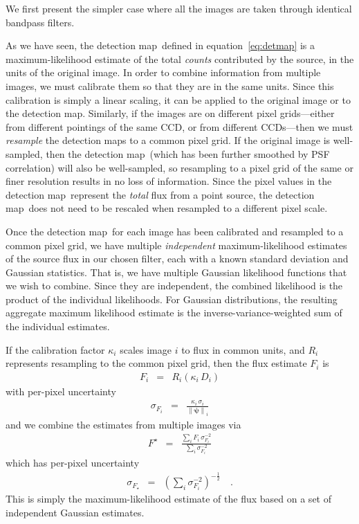 \documentclass[11pt,letterpaper,linenumbers]{aastex63}
\newcommand{\equationname}{equation}
\newcommand{\eqnref}[1]{\mbox{\equationname~\ref{#1}}}
\newcommand{\detmap}{detection map}
\newcommand{\psf}{\psi}
\newcommand{\psfnorm}{\norm{\bm{\psf}}}
\newcommand{\norm}[1]{\left\lVert #1 \right\rVert}
\begin{document}
We first present the simpler case where all the images are taken
through identical bandpass filters.

As we have seen, the \detmap\ defined in \eqnref{eq:detmap} is a
maximum-likelihood estimate of the total \emph{counts} contributed by
the source, in the units of the original image.  In order to
combine information from multiple images, we must calibrate them so
that they are in the same units.  Since this calibration is simply a
linear scaling, it can be applied to the original image or to the
\detmap.  Similarly, if the images are on different pixel
grids---either from different pointings of the same CCD, or from
different CCDs---then we must \emph{resample} the \detmap s to a
common pixel grid.
%
If the original image is well-sampled, then the \detmap\ (which has
been further smoothed by PSF correlation) will also be well-sampled,
so resampling to a pixel grid of the same or finer resolution results
in no loss of information.
%
Since the pixel values in the \detmap\ represent the \emph{total} flux
from a point source, the \detmap\ does not need to be rescaled when
resampled to a different pixel scale.



Once the \detmap\ for each image has been calibrated and resampled to
a common pixel grid, we have multiple \emph{independent}
maximum-likelihood estimates of the source flux in our chosen filter,
each with a known standard deviation and Gaussian statistics.  That
is, we have multiple Gaussian likelihood functions that we wish to
combine.  Since they are independent, the combined likelihood is the
product of the individual likelihoods.  For Gaussian distributions,
the resulting aggregate maximum likelihood estimate is the
inverse-variance-weighted sum of the individual estimates.

If the calibration factor $\kappa_i$ scales image $i$ to flux in
common units, and $R_i$ represents resampling to the common pixel grid,
then the flux estimate $F_i$ is
\begin{eqnarray}
F_i &=& R_i(\kappa_i \, D_i)
\end{eqnarray}
with per-pixel uncertainty
\begin{eqnarray}
\sigma_{F_i} &=& \frac{\kappa_i \, \sigma_{i}}{\psfnorm_i}
\end{eqnarray}
and we combine the estimates from multiple images via
\begin{eqnarray}
F^{\star} &=& \frac{\displaystyle\sum_i F_i \, \sigma^{-2}_{F_i}}{\displaystyle\sum_i \sigma^{-2}_{F_i}}
\label{eq:onebandmap}
\end{eqnarray}
which has per-pixel uncertainty
\begin{eqnarray}
  \sigma_{F_{\star}} &=& \left( \sum_i \sigma^{-2}_{F_i} \right)^{-\frac{1}{2}}    \quad .
  \label{eq:onebandstd}
\end{eqnarray}
This is simply the maximum-likelihood estimate of the flux based on a
set of independent Gaussian estimates.
\end{document}
